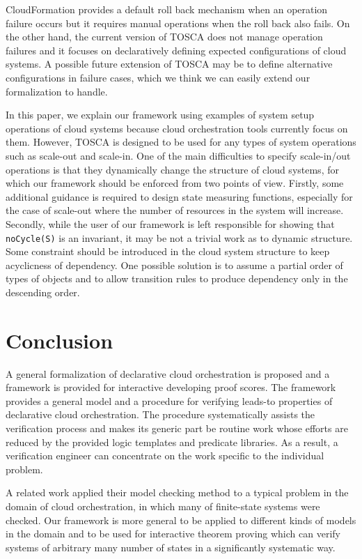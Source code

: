 \documentclass[12pt]{report}
\newcommand{\stt}[1]{{\small{\tt {#1}}}}
\begin{document}
CloudFormation provides a default roll back mechanism when an
operation failure occurs but it requires manual operations when the
roll back also fails. On the other hand, the current version of TOSCA
does not manage operation failures and it focuses on declaratively
defining expected configurations of cloud systems. A possible
future extension of TOSCA may be to define alternative configurations
in failure cases, which we think we can easily extend our
formalization to handle.

In this paper, we explain our framework using examples of system setup
operations of cloud systems because cloud orchestration tools
currently focus on them. However, TOSCA is designed to be used for any
types of system operations such as scale-out and scale-in. One of the
main difficulties to specify scale-in/out operations is that they
dynamically change the structure of cloud systems, for which our
framework should be enforced from two points of view. Firstly, some
additional guidance is required to design state measuring functions,
especially for the case of scale-out where the number of resources in
the system will increase. Secondly, while the user of our framework is
left responsible for showing that \stt{noCycle(S)} is an invariant, it
may be not a trivial work as to dynamic structure. Some constraint
should be introduced in the cloud system structure to keep acyclicness
of dependency. One possible solution is to assume a partial order of
types of objects and to allow transition rules to produce dependency only
in the descending order.

\section{Conclusion}
A general formalization of declarative cloud orchestration is proposed
and a framework is provided for interactive developing proof
scores. The framework provides a general model and a procedure for
verifying leads-to properties of declarative cloud orchestration.  The
procedure systematically assists the verification process and makes
its generic part be routine work whose efforts are reduced by the
provided logic templates and predicate libraries. As a result, a
verification engineer can concentrate on the work specific to the
individual problem.

A related work applied their model checking method to a typical
problem in the domain of cloud orchestration, in which many of
finite-state systems were checked. Our framework is more general to be
applied to different kinds of models in the domain and to be used for
interactive theorem proving which can verify systems of arbitrary many
number of states in a significantly systematic way.
\end{document}
